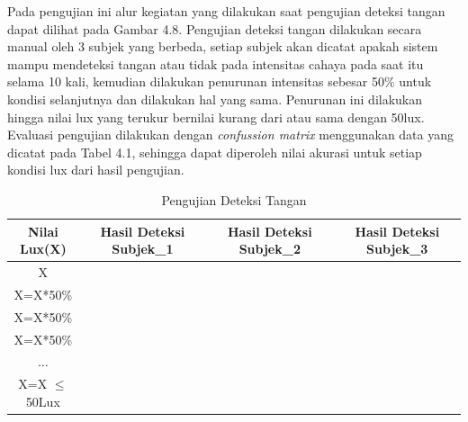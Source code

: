 Pada pengujian ini alur kegiatan yang dilakukan saat pengujian deteksi tangan dapat dilihat pada Gambar 4.8. Pengujian deteksi tangan dilakukan secara manual oleh 3 subjek yang berbeda, setiap subjek akan dicatat apakah sistem mampu mendeteksi tangan atau tidak pada intensitas cahaya pada saat itu selama 10 kali, kemudian dilakukan penurunan intensitas sebesar 50\% untuk kondisi selanjutnya dan dilakukan hal yang sama. Penurunan ini dilakukan hingga nilai lux yang terukur bernilai kurang dari atau sama dengan 50lux. Evaluasi pengujian dilakukan dengan \emph{confussion matrix} menggunakan data yang dicatat pada Tabel 4.1, sehingga dapat diperoleh nilai akurasi untuk setiap kondisi lux dari hasil pengujian.
\begin{table}[H]
	\caption{Pengujian Deteksi Tangan}
	\vspace{0cm}
	\centering
	\begin{tabular}{|c|c|c|c|c|c|c|c|c|c|c|c|c|c|c|c|c|c|c|c|c|c|c|c|c|c|c|c|c|c|c|}
		\hline
		Nilai Lux(X) & \multicolumn{10}{|c|}{Hasil Deteksi Subjek\_1} & \multicolumn{10}{|c|}{Hasil Deteksi Subjek\_2}& \multicolumn{10}{|c|}{Hasil Deteksi Subjek\_3}\\
		\hline X & & & &&&&&&&&&&&&&&&&&&&&&&&&&&&\\
		\hline X=X*50\% & & & &&&&&&&&&&&&&&&&&&&&&&&&&&&\\
		\hline X=X*50\% & & & & && &&&&&&&&&&&&&&&&&&&&&&&&\\
		\hline X=X*50\% & & & &&&&&&& &&&&&&&&&&&&&&&&&&&&\\
		\hline $\dots$ & & & & & &&&&&&&&&&&&&&&&&&&&&&&&&\\
		\hline X=X $\le$ 50Lux & & & &&&&&&& &&&&&&&&&&&&&&&&&&&&\\
		\hline
	\end{tabular}
\end{table}
